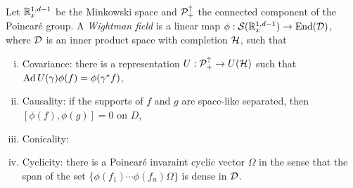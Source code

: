 \documentclass{../../large}
\begin{document}
\begin{prb}
Let $\mathbb{R}_x^{1,d-1}$ be the Minkowski space and $\mathcal{P}_+^\uparrow$ the connected component of the Poincar\'e group.
A \emph{Wightman field} is a linear map $\phi:\mathcal{S}(\mathbb{R}_x^{1,d-1})\to\operatorname{End}(\mathcal{D})$, where $\mathcal{D}$ is an inner product space with completion $\mathcal{H}$, such that
\begin{enumerate}[(i)]
\item Covariance: there is a representation $U:\mathcal{P}_+^\uparrow\to U(\mathcal{H})$ such that $\operatorname{Ad} U(\gamma)\phi(f)=\phi(\gamma^*f)$,
\item Causality: if the supports of $f$ and $g$ are space-like separated, then $[\phi(f),\phi(g)]=0$ on $D$,
\item Conicality: 
\item Cyclicity: there is a Poincar\'e invaraint cyclic vector $\Omega$ in the sense that the span of the set $\{\phi(f_1)\cdots\phi(f_n)\Omega\}$ is dense in $\mathcal{D}$.
\end{enumerate}
\end{prb}
\end{document}
